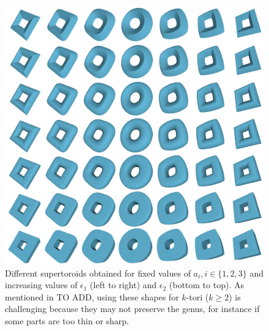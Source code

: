 \begin{figure}[t]
  \centering
  \includegraphics[width=\linewidth]{figs/topogen/toroids_overview.png}
  \caption{Different supertoroids obtained for fixed values of $a_i, i \in \{1, 2, 3\}$ and increasing values of $\epsilon_1$ (left to right) and $\epsilon_2$ (bottom to top). As mentioned in TO ADD, using these shapes for $k$-tori ($k \geq 2$) is challenging because they may not preserve the genus, for instance if some parts are too thin or sharp.}
  \label{fig:toroids-overview}
\end{figure}

